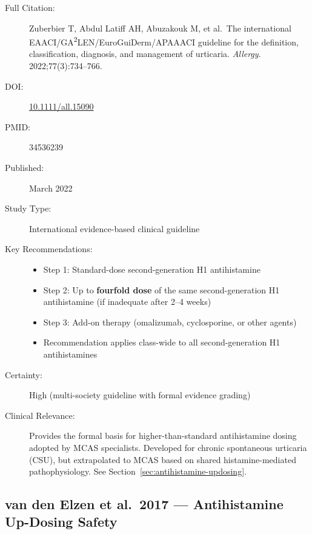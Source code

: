 \begin{description}
    \item[Full Citation:] Zuberbier T, Abdul Latiff AH, Abuzakouk M, et al.\ The international EAACI/GA\textsuperscript{2}LEN/EuroGuiDerm/APAAACI guideline for the definition, classification, diagnosis, and management of urticaria. \textit{Allergy}. 2022;77(3):734--766.
    \item[DOI:] \href{https://doi.org/10.1111/all.15090}{10.1111/all.15090}
    \item[PMID:] 34536239
    \item[Published:] March 2022
    \item[Study Type:] International evidence-based clinical guideline
    \item[Key Recommendations:]
    \begin{itemize}
        \item Step 1: Standard-dose second-generation H1 antihistamine
        \item Step 2: Up to \textbf{fourfold dose} of the same second-generation H1 antihistamine (if inadequate after 2--4 weeks)
        \item Step 3: Add-on therapy (omalizumab, cyclosporine, or other agents)
        \item Recommendation applies class-wide to all second-generation H1 antihistamines
    \end{itemize}
    \item[Certainty:] High (multi-society guideline with formal evidence grading)
    \item[Clinical Relevance:] Provides the formal basis for higher-than-standard antihistamine dosing adopted by MCAS specialists. Developed for chronic spontaneous urticaria (CSU), but extrapolated to MCAS based on shared histamine-mediated pathophysiology. See Section~\ref{sec:antihistamine-updosing}.
\end{description}

\subsection{van den Elzen et al.\ 2017 --- Antihistamine Up-Dosing Safety}

